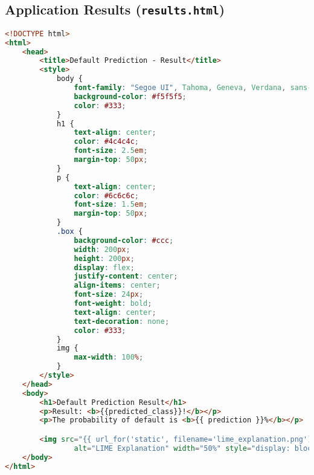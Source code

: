 \subsection{Application Results (\lstinline{results.html})}

\begin{lstlisting}[language=HTML, basicstyle=\footnotesize\ttfamily]
<!DOCTYPE html>
<html>
	<head>
		<title>Default Prediction - Result</title>
		<style>
			body {
				font-family: "Segoe UI", Tahoma, Geneva, Verdana, sans-serif;
				background-color: #f5f5f5;
				color: #333;
			}
			h1 {
				text-align: center;
				color: #4c4c4c;
				font-size: 2.5em;
				margin-top: 50px;
			}
			p {
				text-align: center;
				color: #6c6c6c;
				font-size: 1.5em;
				margin-top: 50px;
			}
			.box {
				background-color: #ccc;
				width: 200px;
				height: 200px;
				display: flex;
				justify-content: center;
				align-items: center;
				font-size: 24px;
				font-weight: bold;
				text-align: center;
				text-decoration: none;
				color: #333;
			}
			img {
				max-width: 100%;
			}
		</style>
	</head>
	<body>
		<h1>Default Prediction Result</h1>
		<p>Result: <b>{{predicted_class}}!</b></p>
		<p>The probability of default is <b>{{ prediction }}%</b></p>

		<img src="{{ url_for('static', filename='lime_explanation.png') }}" 
				alt="LIME Explanation" width="50%" style="display: block; margin: auto;" />
	</body>
</html>	
\end{lstlisting}

\restoregeometry
\fancyheadoffset{0pt}